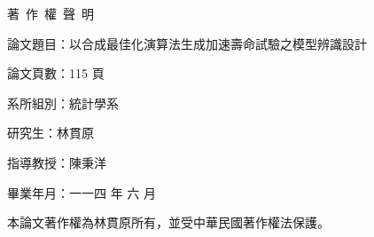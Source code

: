 \renewcommand\bibname{References}
\cleardoublepage
{} 



\appendix
\cleardoublepage


\cleardoublepage
\begin{center}
    \huge 著~作~權~聲~明
\end{center}

\vspace*{1cm}
論文題目：以合成最佳化演算法生成加速壽命試驗之模型辨識設計

論文頁數：115 頁

系所組別：統計學系

研究生：林貫原

指導教授：陳秉洋

畢業年月：一一四 年 六 月

本論文著作權為林貫原所有，並受中華民國著作權法保護。





